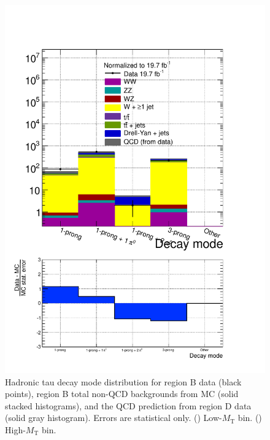 \begin{figure}[hbtp]
\begin{center}
    \includegraphics[width=\cmsFigWidth]{figures/dataVsMCQCD_tauHadDecayMode_highMT_v87}
    \caption{Hadronic tau decay mode distribution for region B data (black points), region B total non-QCD backgrounds from MC (solid stacked histograms), and the QCD prediction from region D data (solid gray histogram).  Errors are statistical only. (\cmsLeft) Low-$M_{\text{T}}$ bin. (\cmsRight) High-$M_{\text{T}}$ bin.}
    \label{fig:regB-data-MC-tauHadDecayMode}
  \end{center}
\end{figure}

